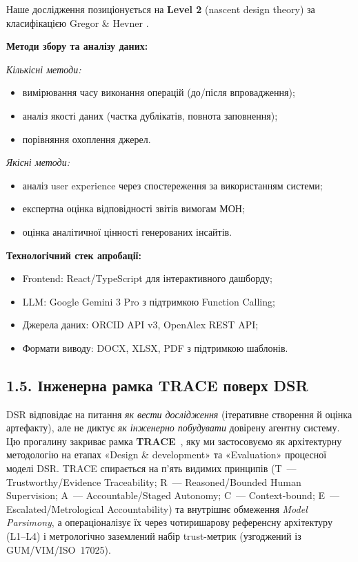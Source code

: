 Наше дослідження позиціонується на \textbf{Level 2} (nascent design theory) за класифікацією Gregor \& Hevner \cite{Gregor2013PositioningDSR}.

\textbf{Методи збору та аналізу даних:}

\textit{Кількісні методи:}
\begin{itemize}[leftmargin=*,itemsep=0.2em]
\item вимірювання часу виконання операцій (до/після впровадження);
\item аналіз якості даних (частка дублікатів, повнота заповнення);
\item порівняння охоплення джерел.
\end{itemize}

\textit{Якісні методи:}
\begin{itemize}[leftmargin=*,itemsep=0.2em]
\item аналіз user experience через спостереження за використанням системи;
\item експертна оцінка відповідності звітів вимогам МОН;
\item оцінка аналітичної цінності генерованих інсайтів.
\end{itemize}

\textbf{Технологічний стек апробації:}
\begin{itemize}[leftmargin=*,itemsep=0.2em]
\item Frontend: React/TypeScript для інтерактивного дашборду;
\item LLM: Google Gemini 3 Pro з підтримкою Function Calling;
\item Джерела даних: ORCID API v3, OpenAlex REST API;
\item Формати виводу: DOCX, XLSX, PDF з підтримкою шаблонів.
\end{itemize}

\iftrace
\subsection*{1.5. Інженерна рамка TRACE поверх DSR}

DSR відповідає на питання \emph{як вести дослідження} (ітеративне створення й оцінка артефакту), але не диктує \emph{як інженерно побудувати} довірену агентну систему. Цю прогалину закриває рамка \textbf{TRACE}~\cite{Zabolotnii2026TRACE}, яку ми застосовуємо як архітектурну методологію на етапах «Design \& development» та «Evaluation» процесної моделі DSR. TRACE спирається на п'ять видимих принципів (T~--- Trustworthy/Evidence Traceability; R~--- Reasoned/Bounded Human Supervision; A~--- Accountable/Staged Autonomy; C~--- Context-bound; E~--- Escalated/Metrological Accountability) та внутрішнє обмеження \emph{Model Parsimony}, а операціоналізує їх через чотиришарову референсну архітектуру (L1--L4) і метрологічно заземлений набір trust-метрик (узгоджений із GUM/VIM/ISO~17025).

